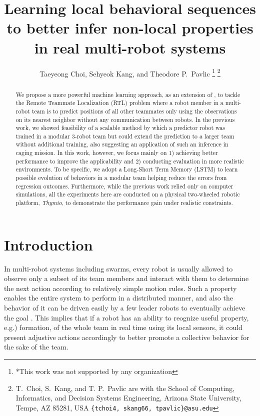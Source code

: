 \documentclass[letterpaper, 10 pt, conference]{ieeeconf}  %
\title{\LARGE \bf
	Learning local behavioral sequences
	to better infer non-local properties in real multi-robot systems
}
\author{Taeyeong Choi, Sehyeok Kang, and Theodore P.~Pavlic %
	\thanks{*This work was not supported by any organization}%
	\thanks{T.~Choi, S.~Kang, and T. P.~Pavlic are with the School of Computing, Informatics, and Decision Systems Engineering,
		Arizona State University, Tempe, AZ 85281, USA
		{\tt\small \{tchoi4, skang66, tpavlic\}@asu.edu}}%
}
\begin{document}
	\maketitle
	\thispagestyle{empty}
	\pagestyle{empty}


	\begin{abstract}

		We propose a more powerful machine learning approach, as an extension of \cite{CPR17},
		to tackle the Remote Teammate
		Localization (RTL) problem where a robot member in a multi-robot team is to predict positions
		of all other teammates only using the observations on its nearest neighbor without any
		communication between robots.
		In the previous work, we showed feasibility of a scalable method by which
		a predictor robot was trained in a modular 3-robot team but could extend the prediction
		to a larger
		team without additional training, also suggesting an application of such an inference in
		caging mission.
		In this work, however, we focus mainly on 1) achieving better performance
		to improve the applicability and 2) conducting evaluation in
		more realistic environments. To be specific, we adopt a Long-Short Term Memory (LSTM) \cite{HS97}
		to learn possible evolution of behaviors in a modular team helping reduce the errors
		from regression outcomes. Furthermore, while the previous work relied only on computer simulations,
		all the experiments here are conducted on a physical two-wheeled robotic platform, \emph{Thymio},
		to demonstrate the performance gain under realistic constraints.

	\end{abstract}



	\section{Introduction}
	\label{sec:intro}

	In multi-robot systems including swarms, every robot is usually allowed to observe
	only a subset of its team members and interact with them to determine the next action
	according to relatively simple motion rules.
	Such a property enables the entire system to perform in a distributed manner, and
	also the behavior of it can be driven easily by a few leader robots to
	eventually achieve the goal \cite{CPR17, DGRSS17, EB16, Stern18}.
	This implies that if a robot has an ability to reognize useful property, e.g.) formation,
	of the whole team in real time using its local sensors,
	it could present adjustive actions accordingly to better promote a collective behavior
	for the sake of the team.
\end{document}
